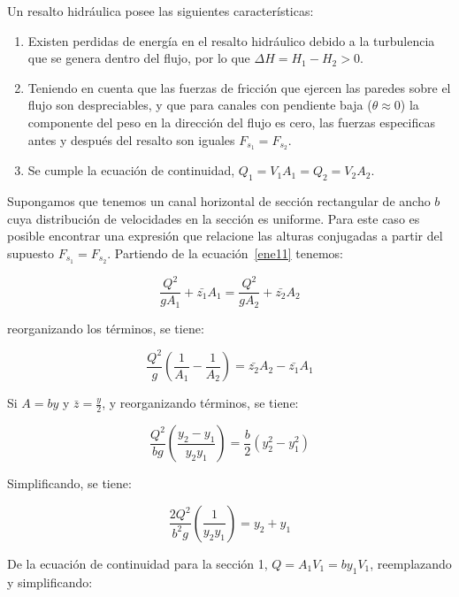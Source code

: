 \documentclass[11pt, oneside]{article}
\begin{document}
Un resalto hidr\'aulica posee las siguientes caracter\'isticas:
\begin{enumerate}
\item Existen perdidas de energ\'ia en el resalto hidr\'aulico debido a la turbulencia que se genera dentro del flujo, por lo que $\Delta H = H_1 - H_2 > 0$.
\item Teniendo en cuenta que las fuerzas de fricci\'on que ejercen las paredes sobre el flujo son despreciables, y que para canales con pendiente baja ($\theta \approx 0$) la componente del peso en la direcci\'on del flujo es cero, las fuerzas especificas antes y después del resalto son iguales $F_{s_1} = F_{s_2}$. 
\item Se cumple la ecuaci\'on de continuidad, $Q_1 = V_1 A_1 = Q_2 = V_2 A_2$.
\end{enumerate}

Supongamos que tenemos un canal horizontal de secci\'on rectangular de ancho $b$ cuya distribuci\'on de velocidades en la secci\'on es uniforme. Para este caso es posible encontrar una expresi\'on que relacione las alturas conjugadas a partir del supuesto $F_{s_1} = F_{s_2}$. Partiendo de la ecuaci\'on~\ref{ene11} tenemos:

$$
\frac{Q^2}{g A_1} + \bar{z_1}A_1 = \frac{Q^2}{g A_2} + \bar{z_2}A_2 
$$

reorganizando los t\'erminos, se tiene:

$$
\frac{Q^2}{g}\left( \frac{1}{A_1} - \frac{1}{A_2} \right) = \bar{z_2}A_2 - \bar{z_1}A_1 
$$

Si $A=by$ y $\bar{z}=\frac{y}{2}$, y reorganizando t\'erminos, se tiene:

$$
\frac{Q^2}{bg}\left( \frac{y_2 - y_1 }{y_2 y_1}\right) = \frac{b}{2}\left( y_2^2 - y_1^2 \right)
$$

Simplificando, se tiene:

$$
\frac{2 Q^2}{b^2 g}\left( \frac{1}{y_2 y_1}\right) = y_2 + y_1
$$

De la ecuaci\'on de continuidad para la secci\'on 1, $Q=A_1 V_1 = by_1 V_1$, reemplazando y simplificando:
\end{document}
